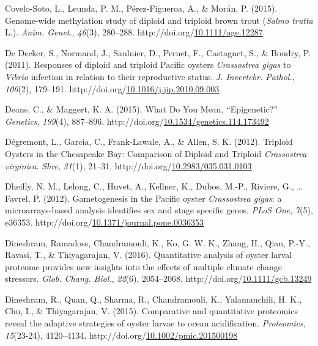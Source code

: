 \documentclass [11pt, proquest] {uwthesis}[2015/03/03]
\newlength{\cslhangindent}
\newenvironment{CSLReferences}%
{\setlength{\parindent}{0pt}%
\everypar{\setlength{\hangindent}{\cslhangindent}}\ignorespaces}%
{\par}
\begin{document}
\begin{CSLReferences}{1}{0}
\leavevmode\hypertarget{ref-Covelo-Soto2015}{}%
Covelo-Soto, L., Leunda, P. M., Pérez-Figueroa, A., \& Morán, P. (2015). {Genome-wide methylation study of diploid and triploid brown trout (\emph{Salmo trutta} L.)}. \emph{Anim. Genet.}, \emph{46}(3), 280--288. http://doi.org/\href{https://doi.org/10.1111/age.12287}{10.1111/age.12287}

\leavevmode\hypertarget{ref-DeDecker2011}{}%
De Decker, S., Normand, J., Saulnier, D., Pernet, F., Castagnet, S., \& Boudry, P. (2011). {Responses of diploid and triploid Pacific oysters \emph{Crassostrea gigas} to \emph{Vibrio} infection in relation to their reproductive status}. \emph{J. Invertebr. Pathol.}, \emph{106}(2), 179--191. http://doi.org/\href{https://doi.org/10.1016/j.jip.2010.09.003}{10.1016/j.jip.2010.09.003}

\leavevmode\hypertarget{ref-Deans2015}{}%
Deans, C., \& Maggert, K. A. (2015). {What Do You Mean, {``Epigenetic?''}} \emph{Genetics}, \emph{199}(4), 887--896. http://doi.org/\href{https://doi.org/10.1534/genetics.114.173492}{10.1534/genetics.114.173492}

\leavevmode\hypertarget{ref-Degremont2012}{}%
Dégremont, L., Garcia, C., Frank-Lawale, A., \& Allen, S. K. (2012). {Triploid Oysters in the Chesapeake Bay: Comparison of Diploid and Triploid \emph{Crassostrea virginica}}. \emph{Shre}, \emph{31}(1), 21--31. http://doi.org/\href{https://doi.org/10.2983/035.031.0103}{10.2983/035.031.0103}

\leavevmode\hypertarget{ref-Dheilly2012}{}%
Dheilly, N. M., Lelong, C., Huvet, A., Kellner, K., Dubos, M.-P., Riviere, G., \ldots{} Favrel, P. (2012). {Gametogenesis in the Pacific oyster \emph{Crassostrea gigas}: a microarrays-based analysis identifies sex and stage specific genes}. \emph{PLoS One}, \emph{7}(5), e36353. http://doi.org/\href{https://doi.org/10.1371/journal.pone.0036353}{10.1371/journal.pone.0036353}

\leavevmode\hypertarget{ref-Dineshram2016}{}%
Dineshram, Ramadoss, Chandramouli, K., Ko, G. W. K., Zhang, H., Qian, P.-Y., Ravasi, T., \& Thiyagarajan, V. (2016). {Quantitative analysis of oyster larval proteome provides new insights into the effects of multiple climate change stressors}. \emph{Glob. Chang. Biol.}, \emph{22}(6), 2054--2068. http://doi.org/\href{https://doi.org/10.1111/gcb.13249}{10.1111/gcb.13249}

\leavevmode\hypertarget{ref-Dineshram2015}{}%
Dineshram, R., Quan, Q., Sharma, R., Chandramouli, K., Yalamanchili, H. K., Chu, I., \& Thiyagarajan, V. (2015). {Comparative and quantitative proteomics reveal the adaptive strategies of oyster larvae to ocean acidification}. \emph{Proteomics}, \emph{15}(23-24), 4120--4134. http://doi.org/\href{https://doi.org/10.1002/pmic.201500198}{10.1002/pmic.201500198}


\end{CSLReferences}
\end{document}
